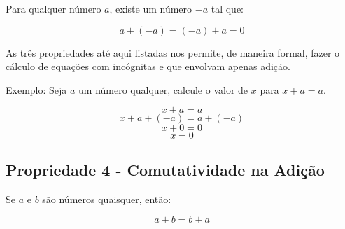 \documentclass[
    12pt, %
    openright,
    twoside, %
    a4paper, %
    article,
    english,brazil %
]{abntex2}
\begin{document}
Para qualquer número $a$, existe um número $-a$ tal que: 

$$a+(-a)=(-a)+a=0$$

As três propriedades até aqui listadas nos permite, de maneira formal, fazer o cálculo de equações com incógnitas e que envolvam apenas adição. 

Exemplo: Seja $a$ um número qualquer, calcule o valor de $x$ para $x+a=a$. 

$$x+a=a$$
$$x+a+(-a)=a+(-a)$$
$$x+0=0$$
$$x=0$$

\subsection{Propriedade 4 - Comutatividade na Adição}

Se $a$ e $b$ são números quaisquer, então: 

$$a+b=b+a$$
\end{document}
